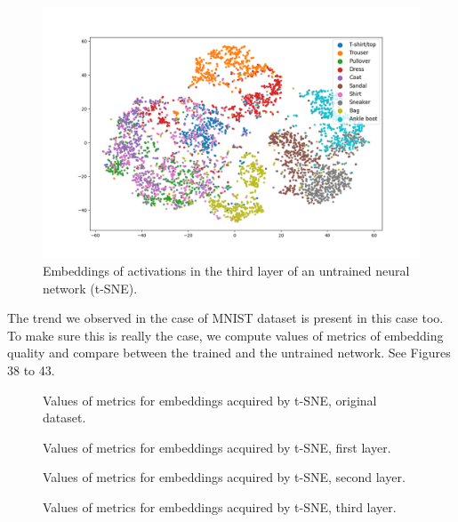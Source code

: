 \documentclass{article}
\begin{document}
\begin{figure}
  \centering
    \includegraphics[width=1.0\textwidth]{../../out/activations_cnn/fmnist/t-sne/untrained/plot_l3.png}
    \caption{Embeddings of activations in the third layer of an untrained neural network (t-SNE).}
\end{figure}

The trend we observed in the case of MNIST dataset is present in this case
too. To make sure this is really the case, we compute values of metrics of
embedding quality and compare between the trained and the untrained network.
See Figures 38 to 43.

\begin{figure}
  \centering
    \resizebox{\textwidth}{!}{
        
    }
  \caption{Values of metrics for embeddings acquired by t-SNE, original dataset.}
\end{figure}

\begin{figure}
  \centering
    \resizebox{\textwidth}{!}{
        
    }
    \caption{Values of metrics for embeddings acquired by t-SNE, first layer.}
\end{figure}

\begin{figure}
  \centering
    \resizebox{\textwidth}{!}{
        
    }
    \caption{Values of metrics for embeddings acquired by t-SNE, second layer.}
\end{figure}

\begin{figure}
  \centering
    \resizebox{\textwidth}{!}{
        
    }
    \caption{Values of metrics for embeddings acquired by t-SNE, third layer.}
\end{figure}
\end{document}
